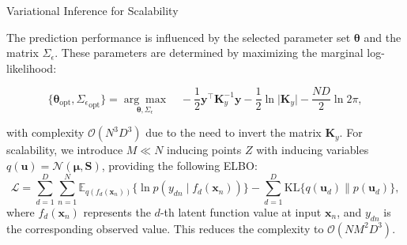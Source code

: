 
\begin{frame}{Variational Inference for Scalability}

	The prediction performance is influenced by the selected parameter set \(\bm{\theta}\) and the matrix \(\Sigma_\epsilon\). These parameters are determined by maximizing the marginal log-likelihood:
	
	\begin{equation*}
		\{\bm{\theta}_{\text{opt}}, {\Sigma_\epsilon}_{\text{opt}}\} = \underset{\bm{\theta}, \Sigma_\epsilon}{\arg\max} \quad -\frac{1}{2} \mathbf{y}^\top \mathbf{K}_y^{-1} \mathbf{y} - \frac{1}{2} \ln \lvert \mathbf{K}_y \rvert - \frac{ND}{2} \ln 2\pi,
	\end{equation*}
	
	with complexity \textcolor{myNewColorB}{\(\mathcal{O}(N^3D^3)\)} due to the need to invert the matrix \(\mathbf{K}_y\).	For scalability, we introduce \(M \ll N\) inducing points \(Z\) with inducing variables $q(\mathbf{u}) = \mathcal{N}(\boldsymbol{\mu}, \mathbf{S})$, providing the following ELBO:
	\begin{equation*}
		\mathcal{L} = \sum_{d=1}^D \sum_{n=1}^N \mathbb{E}_{q(f_d(\mathbf{x}_n))}\{\ln p(y_{dn} \mid f_d(\mathbf{x}_n))\} - \sum_{d=1}^D \text{KL}\{q(\mathbf{u}_d) \parallel p(\mathbf{u}_d)\},
	\end{equation*}
	where $f_d(\mathbf{x}_n)$ represents the $d$-th latent function value at input $\mathbf{x}_n$, and $y_{dn}$ is the corresponding observed value. This reduces the complexity to \textcolor{myNewColorB}{$\mathcal{O}(NM^2D^3)$}.
\end{frame}


